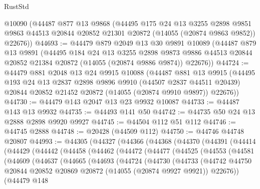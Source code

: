 \begin{lexlean}{RustStd}
\begin{coremodule}
    @10090
    (@44487
      @877
      @13
      @9868
      (@44495
        @175
        @24
        @13
        @3255
        @2898
        @9851
        @9863
        @44513
        @20844
        @20852
        @21301
        @20872
        (@14055 (@20874 @9863 @9852))
        @22676))
@44693 := @44479
    @879
    @2049
    @13
    @30
    @9891
    @10089
    (@44487
      @879
      @13
      @9891
      (@44495
        @184
        @24
        @13
        @3255
        @2898
        @9873
        @9886
        @44513
        @20844
        @20852
        @21384
        @20872
        (@14055 (@20874 @9886 @9874))
        @22676))
@44724 := @44479
    @881
    @2048
    @13
    @24
    @9915
    @10088
    (@44487
      @881
      @13
      @9915
      (@44495
        @193
        @24
        @13
        @2837
        @2898
        @9896
        @9910
        (@44507 @2837 @44511 @20439)
        @20844
        @20852
        @21452
        @20872
        (@14055 (@20874 @9910 @9897))
        @22676))
@44730 := @44479 @143 @2047 @13 @23 @9932 @10087
@44733 := @44487 @143 @13 @9932
@44735 := @44493 @141 @50
@44742 := @44735 @50 @24 @13 @2888 @2898 @9920 @9927
@44745 := @44504 @112 @51 @112
@44746 := @44745 @2888
@44748 := @20428 (@44509 @112)
@44750 := @44746 @44748 @20807
@44993 := @44305
    (@44327
      (@44366
        (@44368
          (@44370
            (@44391
              (@44414
                (@44429
                  (@44442
                    (@44458
                      (@44462
                        (@44472
                          (@44477
                            (@44525
                              (@44553
                                (@44581
                                  (@44609
                                    (@44637
                                      (@44665
                                        (@44693
                                          (@44724
                                            (@44730
                                              (@44733
                                                (@44742
                                                  @44750
                                                  @20844
                                                  @20852
                                                  @20869
                                                  @20872
                                                  (@14055 (@20874 @9927 @9921))
                                                  @22676))
                                              (@44479
                                                @148

\end{coremodule}
\end{lexlean}
